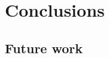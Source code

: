 \documentclass{cslthse-msc}
\begin{document}



\chapter{Conclusions}

\section{Future work}
   
\end{document}
